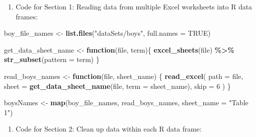 \documentclass[
]{book}
\newenvironment{Shaded}{\begin{snugshade}}{\end{snugshade}}
\newcommand{\ControlFlowTok}[1]{\textcolor[rgb]{0.13,0.29,0.53}{\textbf{#1}}}
\newcommand{\DataTypeTok}[1]{\textcolor[rgb]{0.13,0.29,0.53}{#1}}
\newcommand{\DecValTok}[1]{\textcolor[rgb]{0.00,0.00,0.81}{#1}}
\newcommand{\KeywordTok}[1]{\textcolor[rgb]{0.13,0.29,0.53}{\textbf{#1}}}
\newcommand{\NormalTok}[1]{#1}
\newcommand{\OperatorTok}[1]{\textcolor[rgb]{0.81,0.36,0.00}{\textbf{#1}}}
\newcommand{\OtherTok}[1]{\textcolor[rgb]{0.56,0.35,0.01}{#1}}
\newcommand{\StringTok}[1]{\textcolor[rgb]{0.31,0.60,0.02}{#1}}
\providecommand{\tightlist}{%
  \setlength{\itemsep}{0pt}\setlength{\parskip}{0pt}}
\begin{document}
\begin{enumerate}
\def\labelenumi{\arabic{enumi}.}
\tightlist
\item
  Code for Section 1: Reading data from multiple Excel worksheets into R data frames:
\end{enumerate}

\begin{Shaded}
\begin{Highlighting}[]
\NormalTok{boy\_file\_names \textless{}{-}}\StringTok{ }\KeywordTok{list.files}\NormalTok{(}\StringTok{"dataSets/boys"}\NormalTok{, }\DataTypeTok{full.names =} \OtherTok{TRUE}\NormalTok{)}

\NormalTok{get\_data\_sheet\_name \textless{}{-}}\StringTok{ }\ControlFlowTok{function}\NormalTok{(file, term)\{}
  \KeywordTok{excel\_sheets}\NormalTok{(file) }\OperatorTok{\%\textgreater{}\%}\StringTok{ }\KeywordTok{str\_subset}\NormalTok{(}\DataTypeTok{pattern =}\NormalTok{ term)}
\NormalTok{\}}

\NormalTok{read\_boys\_names \textless{}{-}}\StringTok{ }\ControlFlowTok{function}\NormalTok{(file, sheet\_name) \{}
  \KeywordTok{read\_excel}\NormalTok{(}
    \DataTypeTok{path =}\NormalTok{ file,}
    \DataTypeTok{sheet =} \KeywordTok{get\_data\_sheet\_name}\NormalTok{(file, }\DataTypeTok{term =}\NormalTok{ sheet\_name),}
    \DataTypeTok{skip =} \DecValTok{6}
\NormalTok{  )}
\NormalTok{\}}

\NormalTok{boysNames \textless{}{-}}\StringTok{ }\KeywordTok{map}\NormalTok{(boy\_file\_names, read\_boys\_names, }\DataTypeTok{sheet\_name =} \StringTok{"Table 1"}\NormalTok{)}
\end{Highlighting}
\end{Shaded}

\begin{enumerate}
\def\labelenumi{\arabic{enumi}.}
\setcounter{enumi}{1}
\tightlist
\item
  Code for Section 2: Clean up data within each R data frame:
\end{enumerate}
\end{document}
